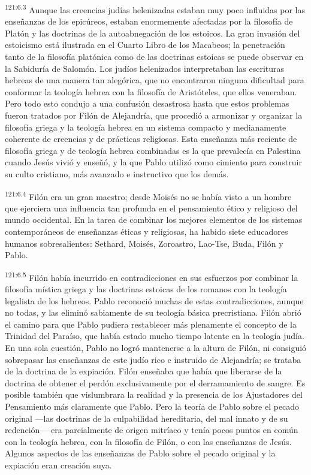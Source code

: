\par 
\textsuperscript{121:6.3} Aunque las creencias judías helenizadas estaban muy poco influidas por las enseñanzas de los epicúreos, estaban enormemente afectadas por la filosofía de Platón y las doctrinas de la autoabnegación de los estoicos. La gran invasión del estoicismo está ilustrada en el Cuarto Libro de los Macabeos; la penetración tanto de la filosofía platónica como de las doctrinas estoicas se puede observar en la Sabiduría de Salomón. Los judíos helenizados interpretaban las escrituras hebreas de una manera tan alegórica, que no encontraron ninguna dificultad para conformar la teología hebrea con la filosofía de Aristóteles, que ellos veneraban. Pero todo esto condujo a una confusión desastrosa hasta que estos problemas fueron tratados por Filón de Alejandría, que procedió a armonizar y organizar la filosofía griega y la teología hebrea en un sistema compacto y medianamente coherente de creencias y de prácticas religiosas. Esta enseñanza más reciente de filosofía griega y de teología hebrea combinadas es la que prevalecía en Palestina cuando Jesús vivió y enseñó, y la que Pablo utilizó como cimiento para construir su culto cristiano, más avanzado e instructivo que los demás.

\par 
\textsuperscript{121:6.4} Filón era un gran maestro; desde Moisés no se había visto a un hombre que ejerciera una influencia tan profunda en el pensamiento ético y religioso del mundo occidental. En la tarea de combinar los mejores elementos de los sistemas contemporáneos de enseñanzas éticas y religiosas, ha habido siete educadores humanos sobresalientes: Sethard, Moisés, Zoroastro, Lao-Tse, Buda, Filón y Pablo.

\par 
\textsuperscript{121:6.5} Filón había incurrido en contradicciones en sus esfuerzos por combinar la filosofía mística griega y las doctrinas estoicas de los romanos con la teología legalista de los hebreos. Pablo reconoció muchas de estas contradicciones, aunque no todas, y las eliminó sabiamente de su teología básica precristiana. Filón abrió el camino para que Pablo pudiera restablecer más plenamente el concepto de la Trinidad del Paraíso, que había estado mucho tiempo latente en la teología judía. En una sola cuestión, Pablo no logró mantenerse a la altura de Filón, ni consiguió sobrepasar las enseñanzas de este judío rico e instruido de Alejandría; se trataba de la doctrina de la expiación. Filón enseñaba que había que liberarse de la doctrina de obtener el perdón exclusivamente por el derramamiento de sangre. Es posible también que vislumbrara la realidad y la presencia de los Ajustadores del Pensamiento más claramente que Pablo. Pero la teoría de Pablo sobre el pecado original ---las doctrinas de la culpabilidad hereditaria, del mal innato y de su redención--- era parcialmente de origen mitríaco y tenía pocos puntos en común con la teología hebrea, con la filosofía de Filón, o con las enseñanzas de Jesús. Algunos aspectos de las enseñanzas de Pablo sobre el pecado original y la expiación eran creación suya.

